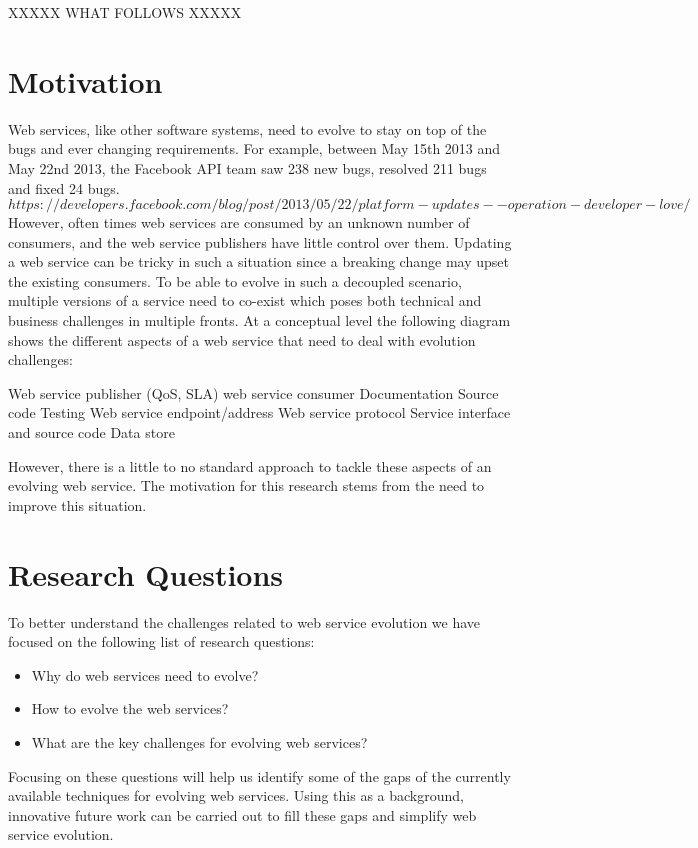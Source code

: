 \documentclass[runningheads,a4paper]{llncs}
\begin{document}
XXXXX WHAT FOLLOWS XXXXX

\section{Motivation} %
\label{sec:motivation}
Web services, like other software systems, need to evolve to stay on top of the bugs and ever changing requirements. For example, between May 15th 2013 and May 22nd 2013, the Facebook API team saw 238 new bugs, resolved 211 bugs and fixed 24 bugs. \[https://developers.facebook.com/blog/post/2013/05/22/platform-updates--operation-developer-love/\] However, often times web services are consumed by an unknown number of consumers, and the web service publishers have little control over them. Updating a web service can be tricky in such a situation since a breaking change may upset the existing consumers. To be able to evolve in such a decoupled scenario, multiple versions of a service need to co-exist which poses both technical and business challenges in multiple fronts. At a conceptual level the following diagram shows the different aspects of a web service that need to deal with evolution challenges:

Web service publisher (QoS, SLA)  web service consumer
Documentation                   Source code
Testing
Web service endpoint/address
Web service protocol
Service interface and source code
Data store

However, there is a little to no standard approach to tackle these aspects of an evolving web service. The motivation for this research stems from the need to improve this situation.


\section{Research Questions} %
\label{sec:research_questions}
To better understand the challenges related to web service evolution we have focused on the following list of research questions:

\begin{itemize}
  \item Why do web services need to evolve?
  \item How to evolve the web services?
  \item What are the key challenges for evolving web services?
\end{itemize}

Focusing on these questions will help us identify some of the gaps of the currently available techniques for evolving web services. Using this as a background, innovative future work can be carried out to fill these gaps and simplify web service evolution.
\end{document}
